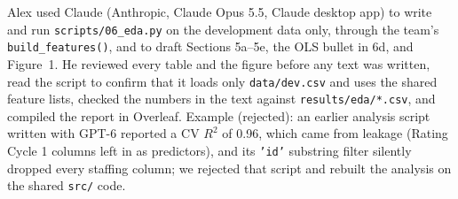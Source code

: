 Alex used Claude (Anthropic, Claude Opus 5.5, Claude desktop app) to write and run \texttt{scripts/06\_eda.py} on the development data only, through the team's \texttt{build\_features()}, and to draft Sections 5a--5e, the OLS bullet in 6d, and Figure~1. He reviewed every table and the figure before any text was written, read the script to confirm that it loads only \texttt{data/dev.csv} and uses the shared feature lists, checked the numbers in the text against \texttt{results/eda/*.csv}, and compiled the report in Overleaf. Example (rejected): an earlier analysis script written with GPT-6  reported a CV $R^2$ of 0.96, which came from leakage (Rating Cycle 1 columns left in as predictors), and its \texttt{'id'} substring filter silently dropped every staffing column; we rejected that script and rebuilt the analysis on the shared \texttt{src/} code.
